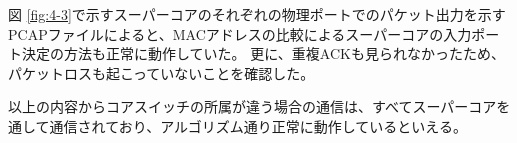 \begin{comment}
\begin{figure}[tb]
\begin{center}
\begin{tabular}{c}

\begin{minipage}{0.4\hsize}
\begin{center}
\texttt{[image: ./lena.eps]}
\hspace{1.6cm} [1]通常画像
\end{center}
\end{minipage}

\begin{minipage}{0.4\hsize}
\begin{center}
\texttt{[image: ./lena-affine.eps]}
\hspace{1.6cm} [2]アフィン変換(90度回転)
\end{center}
\end{minipage}

\end{tabular}
\caption{画像の変換例}
\label{fig:4-3}
\end{center}
\end{figure}
\end{comment}

図 \ref{fig:4-3}で示すスーパーコアのそれぞれの物理ポートでのパケット出力を示すPCAPファイルによると、MACアドレスの比較によるスーパーコアの入力ポート決定の方法も正常に動作していた。
更に、重複ACKも見られなかったため、パケットロスも起こっていないことを確認した。

以上の内容からコアスイッチの所属が違う場合の通信は、すべてスーパーコアを通して通信されており、アルゴリズム通り正常に動作しているといえる。